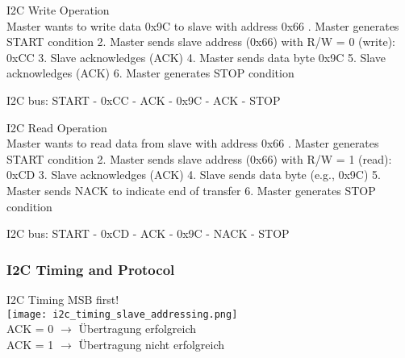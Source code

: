 \begin{example2}{I2C Write Operation}\\
Master wants to write data 0x9C to slave with address 0x66
. Master generates START condition
2. Master sends slave address (0x66) with R/W = 0 (write): 0xCC
3. Slave acknowledges (ACK)
4. Master sends data byte 0x9C
5. Slave acknowledges (ACK)
6. Master generates STOP condition

I2C bus:
START - 0xCC - ACK - 0x9C - ACK - STOP
\end{example2}

\begin{example2}{I2C Read Operation}\\
Master wants to read data from slave with address 0x66
. Master generates START condition
2. Master sends slave address (0x66) with R/W = 1 (read): 0xCD
3. Slave acknowledges (ACK)
4. Slave sends data byte (e.g., 0x9C)
5. Master sends NACK to indicate end of transfer
6. Master generates STOP condition

I2C bus:
START - 0xCD - ACK - 0x9C - NACK - STOP
\end{example2}

\subsubsection{I2C Timing and Protocol}

\begin{concept}{I2C Timing} MSB first!\\
    \texttt{[image: i2c\_timing\_slave\_addressing.png]}\\
    ACK = 0 $\rightarrow$ Übertragung erfolgreich\\
    ACK = 1 $\rightarrow$ Übertragung nicht erfolgreich
\end{concept}




